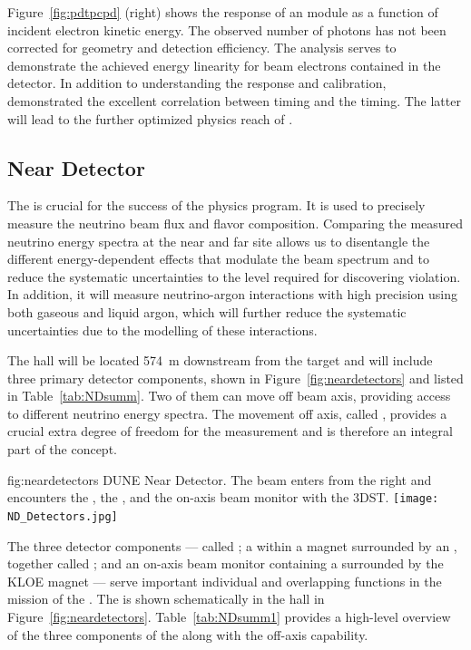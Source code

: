 Figure~\ref{fig:pdtpcpd} (right) shows the response of an %
  module as a function of incident electron kinetic energy.
The observed number of photons has not been corrected for geometry and detection efficiency. The analysis serves to demonstrate the achieved energy linearity for beam electrons contained in the detector.  
In addition to understanding the  response and calibration,  demonstrated the excellent correlation between  timing and the  timing. The latter will lead to the further optimized physics reach of . 


\subsection{Near Detector}
\label{sec:nd-verview}


The   is crucial for the success of the  physics program. It is used to precisely measure the neutrino beam flux and flavor composition. Comparing the measured neutrino energy spectra at the near and far site allows us to disentangle the different energy-dependent effects that modulate the beam spectrum and to reduce the systematic uncertainties to the level required for discovering  violation. In addition, it will measure neutrino-argon interactions with high precision using both gaseous and liquid argon, which will further reduce the systematic uncertainties due to the modelling of these interactions.


The  hall will be located \SI{574}{m} downstream from the target and will include three primary detector components, shown in Figure~\ref{fig:neardetectors}  and listed in Table~\ref{tab:NDsumm}. Two of them can move off beam axis, providing access to different neutrino energy spectra. The movement off axis, called , provides a crucial extra degree of freedom for the  measurement and is therefore an integral part of the   concept. 


\begin{dunefigure}
{fig:neardetectors}
{DUNE Near Detector. The beam enters from the right and encounters
the , the , and the on-axis beam monitor with the 3DST.}
\texttt{[image: ND\_Detectors.jpg]}
\end{dunefigure}

The three detector components ---  called ; a  within a magnet surrounded by an , together called ; and an on-axis beam monitor containing a  surrounded by the KLOE magnet --- serve important individual and overlapping functions in the mission of the . 
The   is shown schematically in the   hall in Figure~\ref{fig:neardetectors}.  
Table~\ref{tab:NDsumm1} provides a high-level overview of the three components of the   along with the off-axis capability.  

